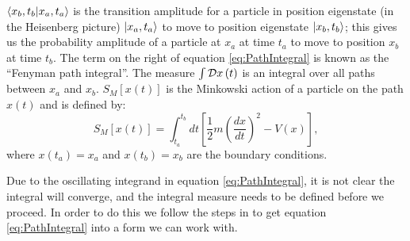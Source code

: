\documentclass[12pt]{article}
\begin{document}
$\braket{x_b,t_b|x_a,t_a}$ is the transition amplitude for a particle in position eigenstate (in the Heisenberg picture) $\ket{x_a,t_a}$ to move to position eigenstate $\ket{x_b,t_b}$; this gives us the probability amplitude of a particle at $x_a$ at time $t_a$ to move to position $x_b$ at time $t_b$. The term on the right of equation \ref{eq:PathIntegral} is known as the ``Fenyman path integral''. The measure $\int {\cal D} x\left(t\right)$ is an integral over all paths between $x_a$ and $x_b$. $S_M\left[x\left(t\right)\right]$ is the Minkowski action of a particle on the path $x\left(t\right)$ and is defined by:
\begin{equation}
	\label{eq:MinkowskiAction}
	S_M\left[x\left(t\right)\right] = \int_{t_a}^{t_b} dt \left[\frac{1}{2}m\left(\frac{dx}{dt}\right)^2 - V(x)\right],
\end{equation}
where $x\left(t_a\right) = x_a$ and $x\left(t_b\right) = x_b$ are the boundary conditions.

Due to the oscillating integrand in equation \ref{eq:PathIntegral}, it is not clear the integral will converge, and the integral measure needs to be defined before we proceed. In order to do this we follow the steps in \cite{creutz_freedman_1981} to get equation \ref{eq:PathIntegral} into a form we can work with. 
\end{document}
